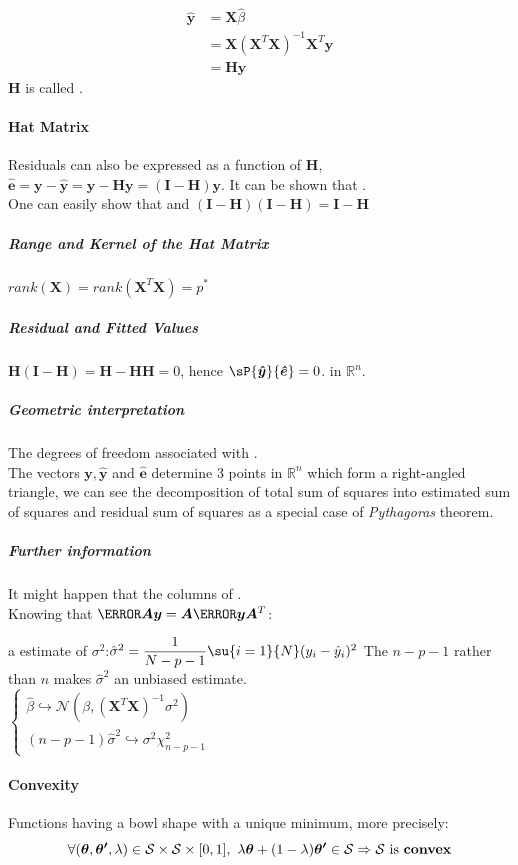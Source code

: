 \begin{align*}
\hat{\bm{y}} &=\bm{X}\hat{\beta}\\
	     &=\bm{X}\left(\bm{X}^{T}\bm{X}\right)^{-1}\bm{X}^{T}\bm{y}\\
	     &=\bm{H}\bm{y}
\end{align*}
$\bm{H}$ is called .
\paragraph{Hat Matrix}
Residuals can also be expressed as a function of $\bm{H}$,
$\bm{\hat{e}} = \bm{y} - \bm{\hat{y}} = \bm{y} - \bm{Hy} = (\bm{I}-\bm{H})\bm{y}$.
It can be shown that .\\
One can easily show that  and $\left(\bm{I-H}\right)\left(\bm{I-H}\right)
= \bm{I-H}$

\subparagraph{Range and Kernel of the Hat Matrix}
$rank(\bm{X}) = rank(\bm{X}^{T}\bm{X}) = p^{*}$
\subparagraph{Residual and Fitted Values}
$\bm{H}(\bm{I}-\bm{H}) = \bm{H} -\bm{HH} = 0$, hence $\sP{\bm{\hat{y}}}{\bm{\hat{e}}} = 0$.
 in $\mathbb{R}^{n}$.
\subparagraph{Geometric interpretation}
The degrees of freedom associated with .\\
The vectors $\bm{y}, \bm{\hat{y}}$ and $\bm{\hat{e}}$ determine 3 points in $\mathbb{R}^{n}$ which
form a right-angled triangle, we can see the decomposition of total sum of squares into estimated
sum of squares and residual sum of squares as a special case of \emph{Pythagoras} theorem.
\subparagraph{Further information}
It might happen that the columns of .\\ 
Knowing that $\V{\bm{A}\bm{y}}=\bm{A}\V{\bm{y}}\bm{A}^{T}$:
\begin{center}
\end{center}
a estimate of $\sigma^{2}$:$\hat{\sigma}^{2} = \dfrac{1}{N-p-1}\su{{i=1}}{N}(y_{i}-\hat{y}_{i})^{2}$ 
The $n-p-1$ rather than $n$ makes $\hat{\sigma}^{2}$ an unbiased
estimate.\\
$
\begin{cases}
\hat{\beta}\hookrightarrow\mathcal{N}\left(\beta, (\bm{X}^{T}\bm{X})^{-1}\sigma^{2}\right)\\
(n-p-1)\hat{\sigma}^{2}\hookrightarrow\sigma^{2}\chi_{n-p-1}^{2}
\end{cases}
$

\paragraph{Convexity}
Functions having a bowl shape with a unique minimum, more precisely:
$$\forall (\bm{\theta}, \bm{\theta'},\lambda) \in \mathcal{S}\times\mathcal{S}\times[0,1],
~ \lambda\bm{\theta} + (1-\lambda)\bm{\theta'} \in \mathcal{S} \Rightarrow \mathcal{S}
\text{ is \textbf{convex}}$$
